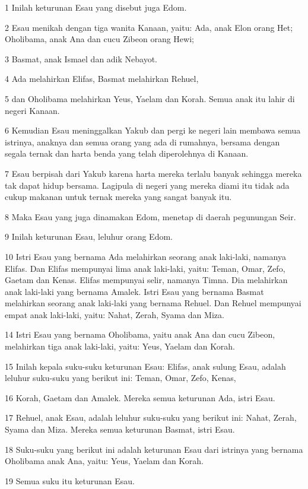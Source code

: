 \par 1 Inilah keturunan Esau yang disebut juga Edom.
\par 2 Esau menikah dengan tiga wanita Kanaan, yaitu: Ada, anak Elon orang Het; Oholibama, anak Ana dan cucu Zibeon orang Hewi;
\par 3 Basmat, anak Ismael dan adik Nebayot.
\par 4 Ada melahirkan Elifas, Basmat melahirkan Rehuel,
\par 5 dan Oholibama melahirkan Yeus, Yaelam dan Korah. Semua anak itu lahir di negeri Kanaan.
\par 6 Kemudian Esau meninggalkan Yakub dan pergi ke negeri lain membawa semua istrinya, anaknya dan semua orang yang ada di rumahnya, bersama dengan segala ternak dan harta benda yang telah diperolehnya di Kanaan.
\par 7 Esau berpisah dari Yakub karena harta mereka terlalu banyak sehingga mereka tak dapat hidup bersama. Lagipula di negeri yang mereka diami itu tidak ada cukup makanan untuk ternak mereka yang sangat banyak itu.
\par 8 Maka Esau yang juga dinamakan Edom, menetap di daerah pegunungan Seir.
\par 9 Inilah keturunan Esau, leluhur orang Edom.
\par 10 Istri Esau yang bernama Ada melahirkan seorang anak laki-laki, namanya Elifas. Dan Elifas mempunyai lima anak laki-laki, yaitu: Teman, Omar, Zefo, Gaetam dan Kenas. Elifas mempunyai selir, namanya Timna. Dia melahirkan anak laki-laki yang bernama Amalek. Istri Esau yang bernama Basmat melahirkan seorang anak laki-laki yang bernama Rehuel. Dan Rehuel mempunyai empat anak laki-laki, yaitu: Nahat, Zerah, Syama dan Miza.
\par 14 Istri Esau yang bernama Oholibama, yaitu anak Ana dan cucu Zibeon, melahirkan tiga anak laki-laki, yaitu: Yeus, Yaelam dan Korah.
\par 15 Inilah kepala suku-suku keturunan Esau: Elifas, anak sulung Esau, adalah leluhur suku-suku yang berikut ini: Teman, Omar, Zefo, Kenas,
\par 16 Korah, Gaetam dan Amalek. Mereka semua keturunan Ada, istri Esau.
\par 17 Rehuel, anak Esau, adalah leluhur suku-suku yang berikut ini: Nahat, Zerah, Syama dan Miza. Mereka semua keturunan Basmat, istri Esau.
\par 18 Suku-suku yang berikut ini adalah keturunan Esau dari istrinya yang bernama Oholibama anak Ana, yaitu: Yeus, Yaelam dan Korah.
\par 19 Semua suku itu keturunan Esau.
